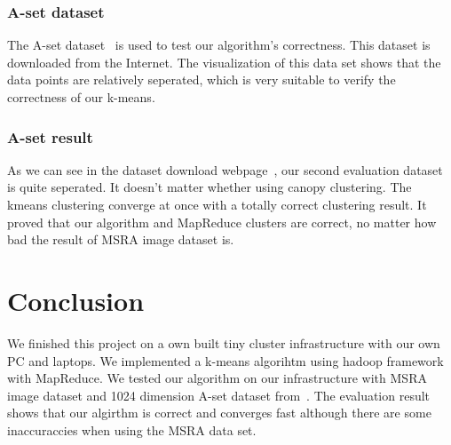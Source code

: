 \documentclass[a4paper,11pt]{article}
\begin{document}
\subsubsection{A-set dataset}
The A-set dataset~\cite{dataset:aset} is used to test our algorithm's
correctness. This dataset is downloaded from the Internet. The visualization of
this data set shows that the data points are relatively seperated, which is very
suitable to verify the correctness of our k-means.

\subsubsection{A-set result}
As we can see in the dataset download webpage~\cite{dataset:aset}, our second
evaluation dataset is quite seperated. It doesn't matter whether using canopy
clustering. The kmeans clustering converge at once with a totally correct
clustering result. It proved that our algorithm and MapReduce clusters are
correct, no matter how bad the result of MSRA image dataset is.

\section{Conclusion}
We finished this project on a own built tiny cluster infrastructure with our own
PC and laptops. We implemented a k-means algorihtm using hadoop framework with
MapReduce. We tested our algorithm on our infrastructure with MSRA image dataset
and 1024 dimension A-set dataset from~\cite{dataset:aset}. The evaluation result
shows that our algirthm is correct and converges fast although there are some
inaccuraccies when using the MSRA data set.



\end{document}
